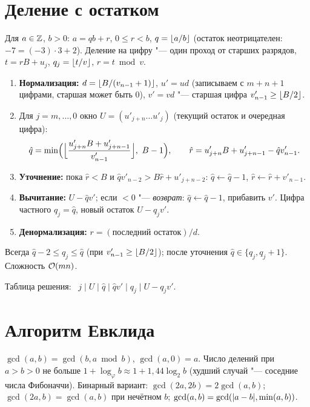 \documentclass{ca-handout}
\begin{document}
\makehandouttitle

\section{Деление с остатком}
Для $a \in \mathbb{Z}$, $b > 0$: $a = qb + r$, $0 \le r < b$, $q = \lfloor a/b\rfloor$ (остаток неотрицателен:
$-7 = (-3) \cdot 3 + 2$). Деление на цифру "--- один проход от старших разрядов,
$t = rB + u_j$, $q_j = \lfloor t/v\rfloor$, $r = t \bmod v$.

\begin{reminder}[title={Алгоритм D Кнута: $u = (u_{m+n-1} \dots u_0)_B$, $v = (v_{n-1} \dots v_0)_B$, $n \ge 2$}]
\begin{enumerate}
  \item \textbf{Нормализация:} $d = \lfloor B/(v_{n-1} + 1)\rfloor$, $u' = ud$ (записываем с $m + n + 1$
    цифрами, старшая может быть $0$), $v' = vd$ "--- старшая цифра $v'_{n-1} \ge \lfloor B/2\rfloor$.
  \item Для $j = m, \dots, 0$ окно $U = (u'_{j+n} \dots u'_j)$ (текущий остаток и очередная цифра):
    \[\hat q = \min\Bigl(\Bigl\lfloor\frac{u'_{j+n} B + u'_{j+n-1}}{v'_{n-1}}\Bigr\rfloor,\ B - 1\Bigr), \qquad
      \hat r = u'_{j+n} B + u'_{j+n-1} - \hat q v'_{n-1}.\]
  \item \textbf{Уточнение:} пока $\hat r < B$ и $\hat q v'_{n-2} > B\hat r + u'_{j+n-2}$:
    $\hat q \gets \hat q - 1$, $\hat r \gets \hat r + v'_{n-1}$.
  \item \textbf{Вычитание:} $U - \hat q v'$; если $< 0$ "--- \emph{возврат}: $\hat q \gets \hat q - 1$,
    прибавить $v'$. Цифра частного $q_j = \hat q$, новый остаток $U - q_j v'$.
  \item \textbf{Денормализация:} $r = (\text{последний остаток}) / d$.
\end{enumerate}
Всегда $\hat q - 2 \le q_j \le \hat q$ (при $v'_{n-1} \ge \lfloor B/2\rfloor$); после уточнения
$\hat q \in \{q_j, q_j + 1\}$. Сложность $\mathcal{O}(mn)$.
\end{reminder}
Таблица решения: \ $j \mid U \mid \hat q \mid \hat q v' \mid q_j \mid U - q_j v'$.

\section{Алгоритм Евклида}
$\gcd(a, b) = \gcd(b, a \bmod b)$, $\gcd(a, 0) = a$. Число делений при $a > b > 0$ не больше
$1 + \log_\varphi b \approx 1 + 1{,}44 \log_2 b$ (худший случай "--- соседние числа Фибоначчи).
Бинарный вариант: $\gcd(2a, 2b) = 2\gcd(a, b)$; $\gcd(2a, b) = \gcd(a, b)$ при нечётном $b$;
$\gcd(a, b) = \gcd(\lvert a - b\rvert, \min(a, b))$.
\end{document}
